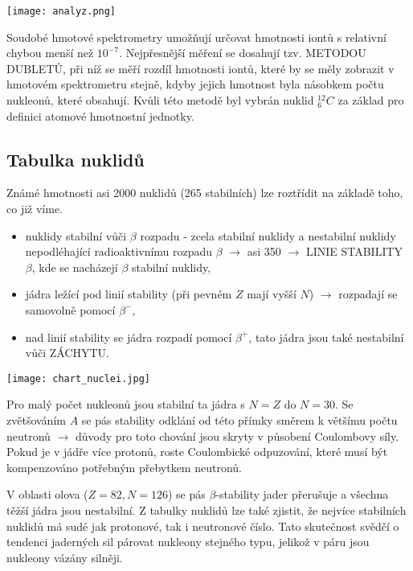 \documentclass[../../main.tex]{subfiles}
\begin{document}
\begin{center}
	\texttt{[image: analyz.png]}
\end{center}

Soudobé hmotové spektrometry umožňují určovat hmotnosti iontů s relativní chybou menší než $10^{-7}$. Nejpřesnější měření se dosahují tzv. METODOU DUBLETŮ, při níž se měří rozdíl hmotnosti iontů, které by se měly zobrazit v hmotovém spektrometru stejně, kdyby jejich hmotnost byla násobkem počtu nukleonů, které obsahují. Kvůli této metodě byl vybrán nuklid $^{12}_{6}C$ za základ pro definici atomové hmotnostní jednotky.

\subsection{Tabulka nuklidů}

Známé hmotnosti asi 2000 nuklidů (265 stabilních) lze roztřídit na základě toho, co již víme. 
\begin{itemize}
	\item nuklidy stabilní vůči $\beta$ rozpadu - zcela stabilní nuklidy a nestabilní nuklidy nepodléhající radioaktivnímu rozpadu $\beta$ $\rightarrow$ asi 350 $\rightarrow$ LINIE STABILITY $\beta$, kde se nacházejí $\beta$ stabilní nuklidy,
	\item jádra ležící pod linií stability (při pevném $Z$ mají vyšší $N$) $\rightarrow$ rozpadají se samovolně pomocí $\beta ^-$,
	\item nad linií stability se jádra rozpadí pomocí $\beta ^+$, tato jádra jsou také nestabilní vůči ZÁCHYTU.
\end{itemize}

\begin{center}
	\texttt{[image: chart\_nuclei.jpg]}
\end{center}

Pro malý počet nukleonů jsou stabilní ta jádra s $N=Z$ do $N=30$. Se zvětšováním $A$ se pás stability odklání od této přímky směrem k většímu počtu neutronů $\rightarrow$ důvody pro toto chování jsou skryty v působení Coulombovy síly. Pokud je v jádře více protonů, roste Coulombické odpuzování, které musí být kompenzováno potřebným přebytkem neutronů. 

V oblasti olova ($Z=82, N=126$) se pás $\beta$-stability jader přerušuje a všechna těžší jádra jsou nestabilní. Z tabulky nuklidů lze také zjistit, že nejvíce stabilních nuklidů má sudé jak protonové, tak i neutronové číslo. Tato skutečnost svědčí o tendenci jaderných sil párovat nukleony stejného typu, jelikož v páru jsou nukleony vázány silněji. 
\end{document}
